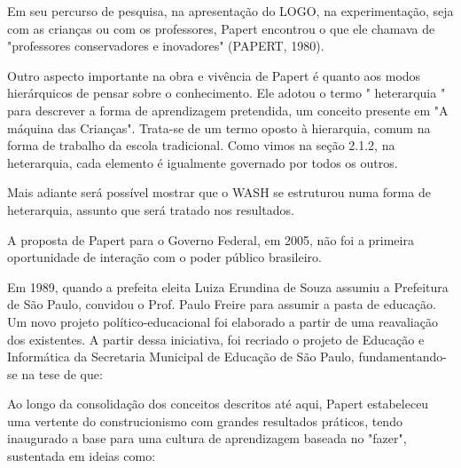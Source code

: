 Em seu percurso de pesquisa, na apresentação do LOGO, na experimentação, seja com as crianças ou com os professores, Papert encontrou o que ele chamava de "professores conservadores e  inovadores" (PAPERT, 1980).

Outro aspecto importante na obra e vivência de Papert é quanto aos modos hierárquicos de pensar sobre o conhecimento. Ele adotou o termo  " heterarquia " para descrever a forma de aprendizagem pretendida, um conceito presente em  "A máquina das Crianças". Trata-se de  um termo oposto à hierarquia, comum na forma de trabalho da escola tradicional. Como vimos na seção 2.1.2, na heterarquia, cada elemento é igualmente governado por todos os outros.

Mais adiante será possível mostrar que o WASH se estruturou numa forma de heterarquia, assunto que será tratado nos resultados.

A proposta de Papert para o Governo Federal, em 2005, não foi a primeira oportunidade de interação com o poder público brasileiro.

Em 1989, quando a prefeita eleita Luiza Erundina de Souza assumiu a Prefeitura de São Paulo, convidou o Prof. Paulo Freire para assumir a pasta de educação. Um novo projeto político-educacional foi elaborado a partir de uma reavaliação dos existentes. A partir dessa iniciativa, foi recriado o projeto de Educação e Informática da Secretaria Municipal de Educação de São Paulo, fundamentando-se na tese de que:


\noindent\begin{flushright}\mbox{\linespread{1}\selectfont\centering{}}\end{flushright}


Ao longo da consolidação dos conceitos descritos até aqui, Papert estabeleceu uma vertente do construcionismo com grandes resultados práticos, tendo inaugurado a base para uma cultura de aprendizagem baseada no "fazer", sustentada em ideias como:


